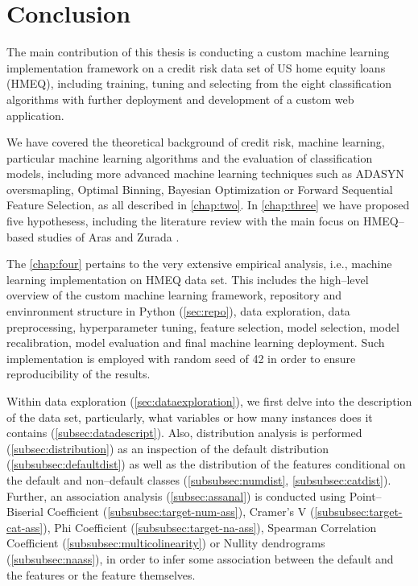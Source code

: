 \chapter{Conclusion}
\label{conclusion}

The main contribution of this thesis is conducting a custom machine learning implementation framework on a credit risk data set of US home equity loans (HMEQ), including training, tuning and selecting from the eight classification algorithms with further deployment and development of a custom web application.

We have covered the theoretical background of credit risk, machine learning, particular machine learning algorithms and the evaluation of classification models, including more advanced machine learning techniques such as ADASYN oversmapling, Optimal Binning, Bayesian Optimization or Forward Sequential Feature Selection, as all described in \autoref{chap:two}.
In \autoref{chap:three} we have proposed five hypothesess, including the literature review with the main focus on HMEQ--based studies of Aras \citep{serkan2021bagging} and Zurada \citep{zurada2014classification}.

The \autoref{chap:four} pertains to the very extensive empirical analysis, i.e., machine learning implementation on HMEQ data set.  This includes the high--level overview of the custom machine learning framework, repository and envinronment structure in Python (\autoref{sec:repo}), data exploration, data preprocessing, hyperparameter tuning, feature selection, model selection, model recalibration, model evaluation and final machine learning deployment.
Such implementation is employed with random seed of 42 in order to ensure reproducibility of the results.

Within data exploration (\autoref{sec:dataexploration}), we first delve into the description of the data set, particularly, what variables or how many instances does it contains (\autoref{subsec:datadescript}).
Also, distribution analysis is performed (\autoref{subsec:distribution}) as an inspection of the default distribution (\autoref{subsubsec:defaultdist}) as well as the distribution of the features conditional on the default and non--default classes (\autoref{subsubsec:numdist}, \autoref{subsubsec:catdist}).
Further, an association analysis (\autoref{subsec:assanal}) is conducted using Point--Biserial Coefficient (\autoref{subsubsec:target-num-ass}),
Cramer's V (\autoref{subsubsec:target-cat-ass}), Phi Coefficient (\autoref{subsubsec:target-na-ass}), Spearman Correlation Coefficient (\autoref{subsubsec:multicolinearity}) or Nullity dendrograms (\autoref{subsubsec:naass}), in order to infer some association between the default and the features or the feature themselves.

